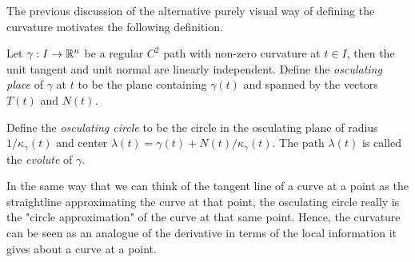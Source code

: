 The previous discussion of the alternative purely visual way of defining the curvature motivates the following definition.

\begin{definition}
    Let $\gamma : I \to \mathbb{R}^n$ be a regular $C^2$ path with non-zero curvature at $t \in I$, then the unit tangent and unit normal are linearly independent. Define the \textit{osculating place} of $\gamma$ at $t$ to be the plane containing $\gamma(t)$ and spanned by the vectors $T(t)$ and $N(t)$.
    
    Define the \textit{osculating circle} to be the circle in the osculating plane of radius $1/\kappa_{\gamma}(t)$ and center $\lambda(t) = \gamma(t) + N(t)/\kappa_{\gamma}(t)$. The path $\lambda(t)$ is called the \textit{evolute} of $\gamma$.
\end{definition}

In the same way that we can think of the tangent line of a curve at a point as the straightline approximating the curve at that point, the osculating circle really is the "circle approximation" of the curve at that same point. Hence, the curvature can be seen as an analogue of the derivative in terms of the local information it gives about a curve at a point. 
